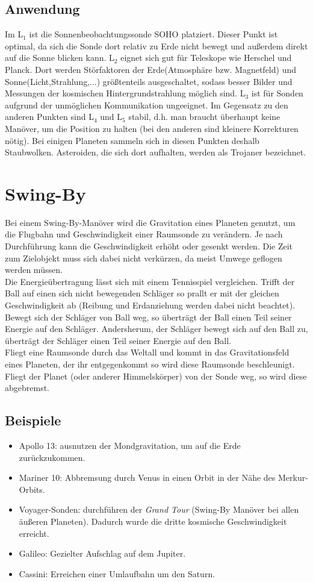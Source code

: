 \documentclass[12pt,a4paper]{article}
\begin{document}
\subsection{Anwendung}
Im L$_1$ ist die Sonnenbeobachtungssonde SOHO platziert. Dieser Punkt ist optimal, da sich die Sonde dort relativ zu Erde nicht bewegt und außerdem direkt auf die Sonne blicken kann. L$_2$ eignet sich gut für Teleskope wie Herschel und Planck. Dort werden Störfaktoren der Erde(Atmosphäre bzw. Magnetfeld) und Sonne(Licht,Strahlung,...) größtenteils ausgeschaltet, sodass besser Bilder und Messungen der kosmischen Hintergrundstrahlung möglich sind. L$_3$ ist für Sonden aufgrund der unmöglichen Kommunikation ungeeignet. Im Gegensatz zu den anderen Punkten sind L$_4$ und L$_5$ stabil, d.h. man braucht überhaupt keine Manöver, um die Position zu halten (bei den anderen sind kleinere Korrekturen nötig). Bei einigen Planeten sammeln sich in diesen Punkten deshalb Staubwolken. Asteroiden, die sich dort aufhalten, werden als Trojaner bezeichnet.
\section{Swing-By}
Bei einem Swing-By-Manöver wird die Gravitation eines Planeten genutzt, um die Flugbahn und Geschwindigkeit einer Raumsonde zu verändern. Je nach Durchführung kann die Geschwindigkeit erhöht oder gesenkt werden.
Die Zeit zum Zielobjekt muss sich dabei nicht verkürzen, da meist Umwege geflogen werden müssen.\\
Die Energieübertragung lässt sich mit einem Tennisspiel vergleichen. Trifft der Ball auf einen sich nicht bewegenden Schläger so prallt er mit der gleichen Geschwindigkeit ab (Reibung und Erdanziehung werden dabei nicht beachtet). Bewegt sich der Schläger von Ball weg, so überträgt der Ball einen Teil seiner Energie auf den Schläger. Andersherum, der Schläger bewegt sich auf den Ball zu, überträgt der Schläger einen Teil seiner Energie auf den Ball.\\
Fliegt eine Raumsonde durch das Weltall und kommt in das Gravitationsfeld eines Planeten, der ihr entgegenkommt so wird diese Raumsonde beschleunigt. Fliegt der Planet (oder anderer Himmelskörper) von der Sonde weg, so wird diese abgebremst. 
\subsection{Beispiele}
\begin{itemize}
\item Apollo 13: ausnutzen der Mondgravitation, um auf die Erde zurückzukommen.
\item Mariner 10: Abbremsung durch Venus in einen Orbit in der Nähe des Merkur-Orbits.
\item Voyager-Sonden: durchführen der \textit{Grand Tour} (Swing-By Manöver bei allen äußeren Planeten). Dadurch wurde die dritte kosmische Geschwindigkeit erreicht.
\item Galileo: Gezielter Aufschlag auf dem Jupiter.
\item Cassini: Erreichen einer Umlaufbahn um den Saturn.
\end{itemize}
\newpage
\end{document}
